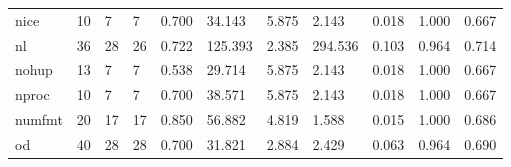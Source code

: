 \begin{longtable}{lp{1.2cm}p{1.2cm}p{1.2cm}p{1.2cm}p{1.2cm}p{1.2cm}p{1.2cm}p{1.2cm}p{1.2cm}p{1.2cm}}
nice      &                           10 &                  7 &                                 7 &                                      0.700 &                                 34.143 &                                        5.875 &                             2.143 &                                   0.018 &                              1.000 &                                              0.667 \\
nl        &                           36 &                 28 &                                26 &                                      0.722 &                                125.393 &                                        2.385 &                           294.536 &                                   0.103 &                              0.964 &                                              0.714 \\
nohup     &                           13 &                  7 &                                 7 &                                      0.538 &                                 29.714 &                                        5.875 &                             2.143 &                                   0.018 &                              1.000 &                                              0.667 \\
nproc     &                           10 &                  7 &                                 7 &                                      0.700 &                                 38.571 &                                        5.875 &                             2.143 &                                   0.018 &                              1.000 &                                              0.667 \\
numfmt    &                           20 &                 17 &                                17 &                                      0.850 &                                 56.882 &                                        4.819 &                             1.588 &                                   0.015 &                              1.000 &                                              0.686 \\
od        &                           40 &                 28 &                                28 &                                      0.700 &                                 31.821 &                                        2.884 &                             2.429 &                                   0.063 &                              0.964 &                                              0.690 \\

\end{longtable}
